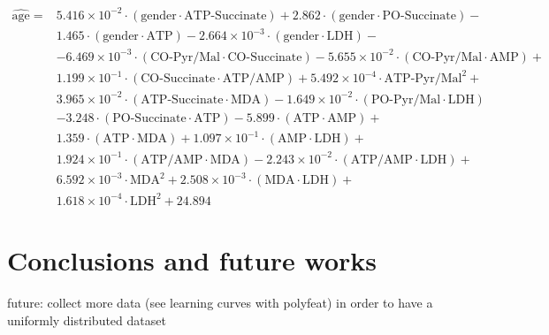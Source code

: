 \begin{equation}\label{eq:frassoni_lasso}
\begin{aligned}
\hat{\text{age}} = {} & 5.416\times 10^{-2} \cdot (\text{gender} \cdot \text{ATP-Succinate}) +
2.862 \cdot (\text{gender} \cdot \text{PO-Succinate}) -\\
& 1.465 \cdot (\text{gender} \cdot \text{ATP}) 
-2.664\times 10^{-3} \cdot (\text{gender} \cdot \text{LDH}) - \\
& -6.469\times 10^{-3} \cdot (\text{CO-Pyr/Mal} \cdot \text{CO-Succinate})
-5.655\times 10^{-2} \cdot (\text{CO-Pyr/Mal} \cdot \text{AMP}) + \\
& 1.199\times 10^{-1} \cdot (\text{CO-Succinate} \cdot \text{ATP/AMP}) +
5.492\times 10^{-4} \cdot \text{ATP-Pyr/Mal}^2 + \\
& 3.965\times 10^{-2} \cdot (\text{ATP-Succinate} \cdot \text{MDA}) -
1.649\times 10^{-2} \cdot (\text{PO-Pyr/Mal} \cdot \text{LDH}) \\
& -3.248 \cdot (\text{PO-Succinate} \cdot \text{ATP})
-5.899 \cdot (\text{ATP} \cdot \text{AMP}) + \\
& 1.359 \cdot (\text{ATP} \cdot \text{MDA}) +
1.097\times 10^{-1} \cdot (\text{AMP} \cdot \text{LDH}) + \\
&1.924\times 10^{-1} \cdot (\text{ATP/AMP} \cdot \text{MDA})
-2.243\times 10^{-2} \cdot (\text{ATP/AMP} \cdot \text{LDH}) + \\
& 6.592\times 10^{-3} \cdot \text{MDA}^2 +
2.508\times 10^{-3} \cdot (\text{MDA} \cdot \text{LDH}) + \\
& 1.618\times 10^{-4} \cdot \text{LDH}^2 + 24.894
\end{aligned}
\end{equation}



\section{Conclusions and future works} \label{sec:frassoni_conclusions}

future: collect more data (see learning curves with polyfeat) in order to have a uniformly distributed dataset

